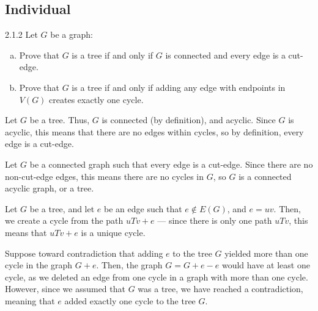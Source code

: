 \documentclass[9pt]{extarticle}
\begin{document}
  \subsection*{Individual}%
  \begin{problem}{2.1.2}
    Let $G$ be a graph:
    \begin{enumerate}[(a)]
      \item Prove that $G$ is a tree if and only if $G$ is connected and every edge is a cut-edge.
      \item Prove that $G$ is a tree if and only if adding any edge with endpoints in $V(G)$ creates exactly one cycle.
    \end{enumerate}
    \tcblower
    \begin{tcolorbox}[colback = white, title = (a), breakable]
      \begin{description}[font=\normalfont\scshape]
        \item[($\Rightarrow$)] Let $G$ be a tree. Thus, $G$ is connected (by definition), and acyclic. Since $G$ is acyclic, this means that there are no edges within cycles, so by definition, every edge is a cut-edge.
        \item[($\Leftarrow$)] Let $G$ be a connected graph such that every edge is a cut-edge. Since there are no non-cut-edge edges, this means there are no cycles in $G$, so $G$ is a connected acyclic graph, or a tree.
      \end{description}
    \end{tcolorbox}
    \begin{tcolorbox}[colback = white, title = (b), breakable]
      \begin{description}[font=\normalfont\scshape]
        \item[($\Rightarrow$)] Let $G$ be a tree, and let $e$ be an edge such that $e\notin E(G)$, and $e = uv$. Then, we create a cycle from the path $uTv + e$ --- since there is only one path $uTv$, this means that $uTv+e$ is a unique cycle.
        \item[($\Leftarrow$)] Suppose toward contradiction that adding $e$ to the tree $G$ yielded more than one cycle in the graph $G+e$. Then, the graph $G = G + e - e$ would have at least one cycle, as we deleted an edge from one cycle in a graph with more than one cycle. However, since we assumed that $G$ was a tree, we have reached a contradiction, meaning that $e$ added exactly one cycle to the tree $G$.
      \end{description}
    \end{tcolorbox}
  \end{problem}
\end{document}
